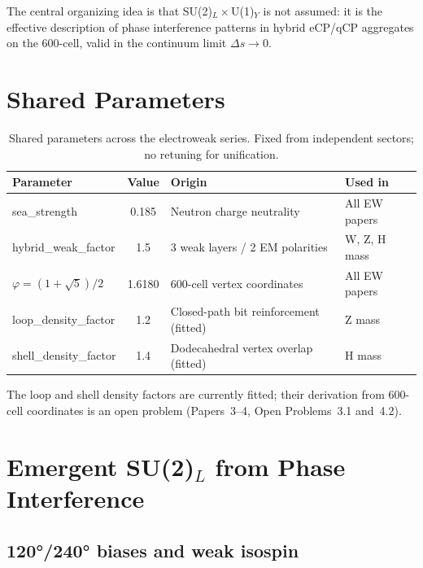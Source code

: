 \documentclass[11pt,a4paper]{article}
\newcommand{\phig}{\varphi}
\begin{document}
The central organizing idea is that SU(2)$_L\times$U(1)$_Y$ is not
assumed: it is the effective description of phase interference patterns
in hybrid eCP/qCP aggregates on the 600-cell, valid in the
continuum limit $\Delta s \to 0$.

\section{Shared Parameters}

\begin{table}[H]
\centering
\caption{Shared parameters across the electroweak series.  Fixed from
  independent sectors; no retuning for unification.}
\label{tab:params}
\begin{tabular}{@{}lcll@{}}
\toprule
Parameter & Value & Origin & Used in \\
\midrule
sea\_strength & 0.185 & Neutron charge neutrality \citep{cpp5014}
  & All EW papers \\
hybrid\_weak\_factor & 1.5 & 3 weak layers / 2 EM polarities
  & W, Z, H mass \\
$\phig = (1+\sqrt5)/2$ & 1.6180 & 600-cell vertex coordinates
  & All EW papers \\
loop\_density\_factor & 1.2 & Closed-path bit reinforcement (fitted)
  & Z mass \\
shell\_density\_factor & 1.4 & Dodecahedral vertex overlap (fitted)
  & H mass \\
\bottomrule
\end{tabular}
\end{table}

The loop and shell density factors are currently fitted; their
derivation from 600-cell coordinates is an open problem
(Papers~3--4, Open Problems~3.1 and~4.2).

\section{Emergent SU(2)$_L$ from Phase Interference}

\subsection{120°/240° biases and weak isospin}
\end{document}
